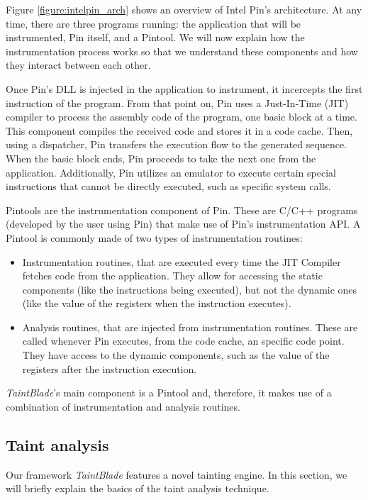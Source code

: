 \documentclass[conference]{IEEEtran}
\begin{document}
Figure \ref{figure:intelpin_arch} shows an overview of Intel Pin's
architecture. At any time, there are three programs running: the application
that will be instrumented, Pin itself, and a Pintool. We will now explain how
the instrumentation process works so that we understand these components and
how they interact between each other.

Once Pin's DLL is injected in the application to instrument, it incercepts the
first instruction of the program. From that point on, Pin uses a Just-In-Time
(JIT) compiler to process the assembly code of the program, one basic block at
a time. This component compiles the received code and stores it in a code
cache. Then, using a dispatcher, Pin transfers the execution flow to the
generated sequence. When the basic block ends, Pin proceeds to take the next
one from the application. Additionally, Pin utilizes an emulator to execute
certain special instructions that cannot be directly executed, such as specific
system calls.

Pintools are the instrumentation component of Pin. These are C/C++ programs
(developed by the user using Pin) that make use of Pin's instrumentation API. A
Pintool is commonly made of two types of instrumentation routines:
\begin{itemize}
    \item Instrumentation routines, that are executed every time the JIT Compiler fetches
          code from the application. They allow for accessing the static components (like
          the instructions being executed), but not the dynamic ones (like the value of
          the registers when the instruction executes).
    \item Analysis routines, that are injected from instrumentation routines. These are
          called whenever Pin executes, from the code cache, an specific code point. They
          have access to the dynamic components, such as the value of the registers after
          the instruction execution.
\end{itemize}

\textit{TaintBlade}'s main component is a Pintool and, therefore, it makes use of a combination of
instrumentation and analysis routines.

\subsection {Taint analysis}\label{subsec:taint_analysis}
Our framework \textit{TaintBlade} features a novel tainting engine. In this
section, we will briefly explain the basics of the taint analysis technique.
\end{document}
